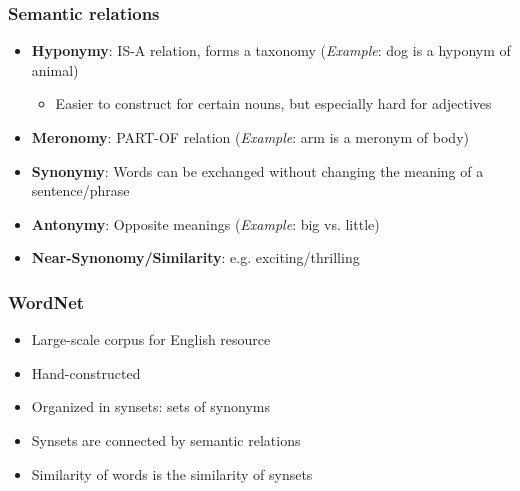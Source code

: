 \subsubsection{Semantic relations}
\begin{itemize}
	\item \textbf{Hyponymy}: IS-A relation, forms a taxonomy (\textit{Example}: dog is a hyponym of animal)
	\begin{itemize}
		\item Easier to construct for certain nouns, but especially hard for adjectives
	\end{itemize}
	\item \textbf{Meronomy}: PART-OF relation (\textit{Example}: arm is a meronym of body)
	\item \textbf{Synonymy}: Words can be exchanged without changing the meaning of a sentence/phrase
	\item \textbf{Antonymy}: Opposite meanings (\textit{Example}: big vs. little)
	\item \textbf{Near-Synonomy/Similarity}: e.g. exciting/thrilling
\end{itemize}
\subsubsection{WordNet}
\begin{itemize}
	\item Large-scale corpus for English resource
	\item Hand-constructed
	\item Organized in synsets: sets of synonyms
	\item Synsets are connected by semantic relations
	\item Similarity of words is the similarity of synsets
\end{itemize}

